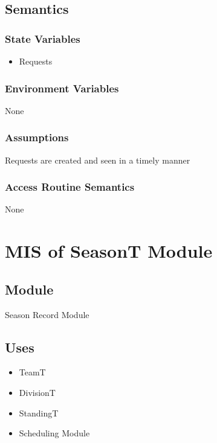 \documentclass[12pt, titlepage]{article}
\begin{document}
\subsection{Semantics}

\subsubsection{State Variables}
\begin{itemize}
  \item Requests
\end{itemize}

\subsubsection{Environment Variables}

None

\subsubsection{Assumptions}

Requests are created and seen in a timely manner

\subsubsection{Access Routine Semantics}

None

\newpage

\section{MIS of SeasonT Module} \label{SeasonT}

\subsection{Module}

Season Record Module

\subsection{Uses} 
\begin{itemize} 
  \item TeamT 
  \item DivisionT 
  \item StandingT 
  \item Scheduling Module 
\end{itemize}
\end{document}
